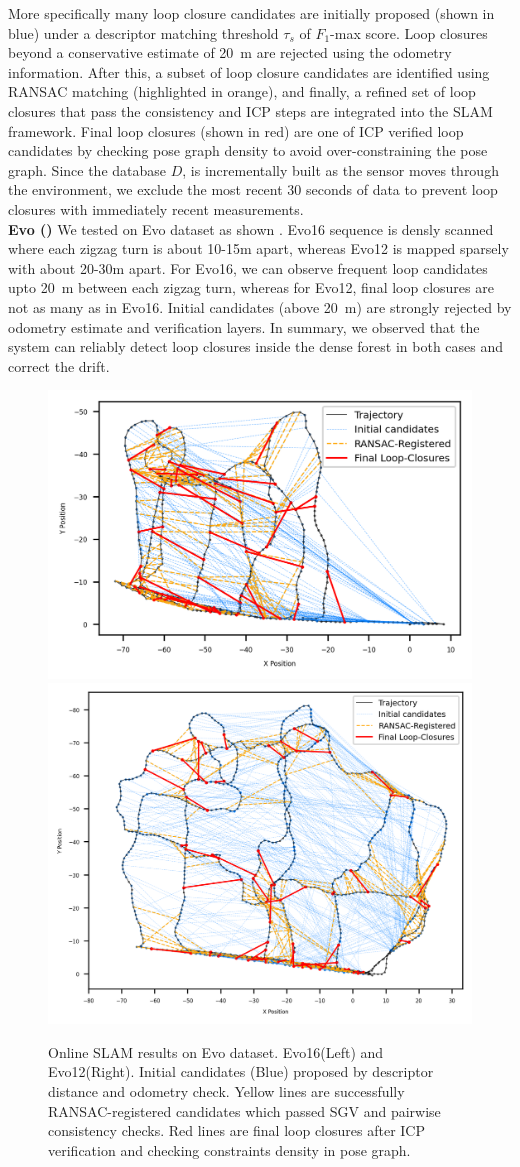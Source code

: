 More specifically many loop closure candidates are initially proposed (shown in blue) under a descriptor matching threshold $\tau_{s}$ of $F_1$-max score. Loop closures beyond a conservative estimate of \SI{20}{\meter} are rejected using the odometry information. After this, a subset of loop closure candidates are identified using RANSAC matching (highlighted in orange), and finally, a refined set of loop closures that pass the consistency and ICP steps are integrated into the SLAM framework. Final loop closures (shown in red) are one of ICP verified loop candidates by checking pose graph density to avoid over-constraining the pose graph. Since the database $D$, is incrementally built as the sensor moves through the environment, we exclude the most recent 30 seconds of data to prevent loop closures with immediately recent measurements.\\
\newline
\textbf{Evo (\textbf{})}\hspace{0.5em} We tested on Evo dataset as shown . Evo16 sequence is densly scanned where each zigzag turn is about 10-15m apart, whereas Evo12 is mapped sparsely with about 20-30m apart. For Evo16, we can observe frequent loop candidates upto \SI{20}{\meter} between each zigzag turn, whereas for Evo12, final loop closures are not as many as in Evo16. Initial candidates (above \SI{20}{\meter}) are strongly rejected by odometry estimate and verification layers. In summary, we observed that the system can reliably detect loop closures inside the dense forest in both cases and correct the drift. \\
\begin{figure}[htbp]
  \centering
  \includegraphics[width=0.53\columnwidth]{pics/exp_2_1_evo16_online2.png}
  \includegraphics[width=0.46\columnwidth]{pics/exp_2_1_evo12_online.png}
  \caption{Online SLAM results on Evo dataset. Evo16(Left) and Evo12(Right). Initial candidates (Blue) proposed by descriptor distance and odometry check. Yellow lines are successfully RANSAC-registered candidates which passed SGV and pairwise consistency checks. Red lines are final loop closures after ICP verification and checking constraints density in pose graph.}
  \label{fig:exp_2_1_evo_online}
\end{figure}
